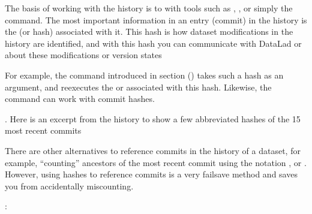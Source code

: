 \sphinxAtStartPar
The basis of working with the history is to  with tools such
as {\hyperref[\detokenize{glossary:term-tig}]{}}, {\hyperref[\detokenize{glossary:term-gitk}]{}}, or simply the  command.
The most important information in an entry (commit) in the history is
the {\hyperref[\detokenize{glossary:term-shasum}]{}} (or hash) associated with it.
This hash is how dataset modifications in the history are identified,
and with this hash you can communicate with DataLad or {\hyperref[\detokenize{glossary:term-Git}]{}} about these
modifications or version states%
\begin{footnote}\sphinxAtStartFootnote
For example, the  command introduced in section
{\hyperref[\detokenize{basics/101-109-rerun:run2}]{}} () takes such a hash as an argument, and re\sphinxhyphen{}executes
the  or  {\hyperref[\detokenize{glossary:term-run-record}]{}} associated with
this hash. Likewise, the  command can work with commit hashes.
%
\end{footnote}.
Here is an excerpt from the  history to show a
few abbreviated hashes of the 15 most recent commits%
\begin{footnote}\sphinxAtStartFootnote
There are other alternatives to reference commits in the history of a dataset,
for example, “counting” ancestors of the most recent commit using the notation
,  or . However, using hashes to reference
commits is a very fail\sphinxhyphen{}save method and saves you from accidentally miscounting.
%
\end{footnote}:

